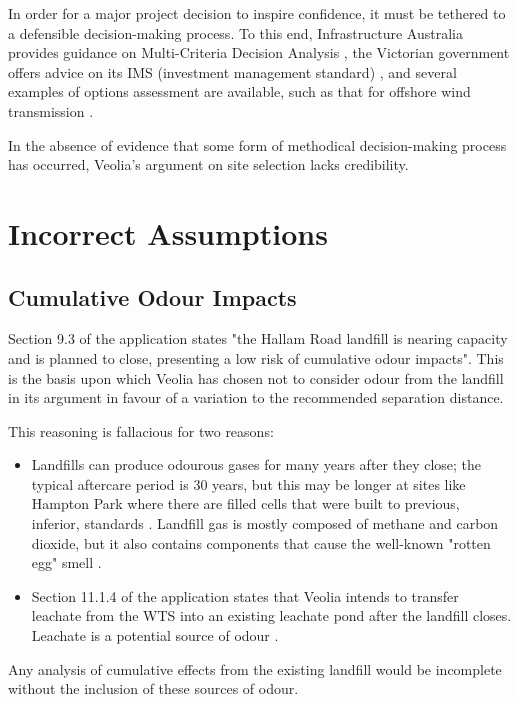 \documentclass[12pt]{article}
\begin{document}
In order for a major project decision to inspire confidence, it must be tethered to a defensible decision-making process. To this end, Infrastructure Australia provides guidance on Multi-Criteria Decision Analysis \cite{infraus}, the Victorian government offers advice on its IMS (investment management standard) \cite{ims}, and several examples of options assessment are available, such as that for offshore wind transmission \cite{vicgrid}.

In the absence of evidence that some form of methodical decision-making process has occurred, Veolia's argument on site selection lacks credibility.

\section{Incorrect Assumptions}

\subsection{Cumulative Odour Impacts}

Section 9.3 of the application states "the Hallam Road landfill is nearing
capacity and is planned to close, presenting a low risk of cumulative odour impacts". This is the basis upon which Veolia has chosen not to consider odour from the landfill in its argument in favour of a variation to the recommended separation distance. 

This reasoning is fallacious for two reasons:

\begin{itemize}
  \item Landfills can produce odourous gases for many years after they close; the typical aftercare period is 30 years, but this may be longer at sites like Hampton Park where there are filled cells that were built to previous, inferior, standards \cite{hubplan}. Landfill gas is mostly composed of methane and carbon dioxide, but it also contains components that cause the well-known "rotten egg" smell \cite{lfginfo}. 
  \item Section 11.1.4 of the application states that Veolia intends to transfer leachate from the WTS into an existing leachate pond after the landfill closes. Leachate is a potential source of odour \cite{epalandfill}.
\end{itemize}

Any analysis of cumulative effects from the existing landfill would be incomplete without the inclusion of these sources of odour. 
\end{document}
